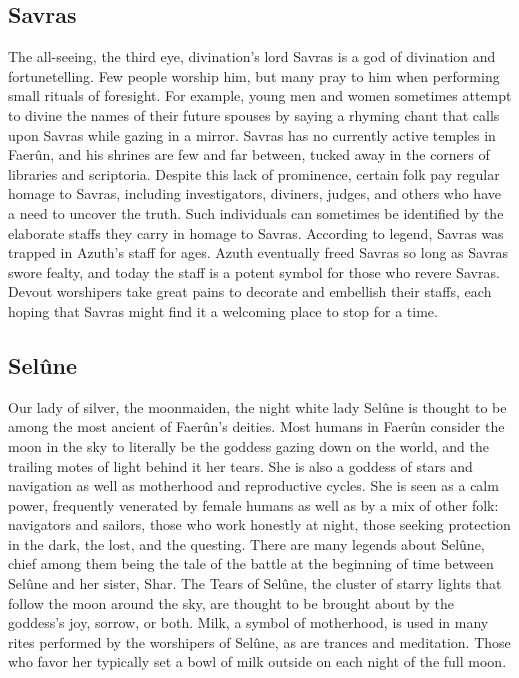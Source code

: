 \documentclass[10pt,a4paper,twoside,twocolumn,openany,bg=print,nodeprecatedcode]{dndbook}
\begin{document}
\subsection{Savras}
The all-seeing, the third eye, divination's lord
Savras is a god of divination and fortunetelling. Few people worship him, but many pray to him when performing small rituals of foresight. For example, young men and women sometimes attempt to divine the names of their future spouses by saying a rhyming chant that calls upon Savras while gazing in a mirror.
Savras has no currently active temples in Faerûn, and his shrines are few and far between, tucked away in the corners of libraries and scriptoria. Despite this lack of prominence, certain folk pay regular homage to Savras, including investigators, diviners, judges, and others who have a need to uncover the truth. Such individuals can sometimes be identified by the elaborate staffs they carry in homage to Savras. According to legend, Savras was trapped in Azuth's staff for ages. Azuth eventually freed Savras so long as Savras swore fealty, and today the staff is a potent symbol for those who revere Savras. Devout worshipers take great pains to decorate and embellish their staffs, each hoping that Savras might find it a welcoming place to stop for a time.
\subsection{Selûne}
Our lady of silver, the moonmaiden, the night white lady
Selûne is thought to be among the most ancient of Faerûn's deities. Most humans in Faerûn consider the moon in the sky to literally be the goddess gazing down on the world, and the trailing motes of light behind it her tears. She is also a goddess of stars and navigation as well as motherhood and reproductive cycles. She is seen as a calm power, frequently venerated by female humans as well as by a mix of other folk: navigators and sailors, those who work honestly at night, those seeking protection in the dark, the lost, and the questing.
There are many legends about Selûne, chief among them being the tale of the battle at the beginning of time between Selûne and her sister, Shar. The Tears of Selûne, the cluster of starry lights that follow the moon around the sky, are thought to be brought about by the goddess's joy, sorrow, or both.
Milk, a symbol of motherhood, is used in many rites performed by the worshipers of Selûne, as are trances and meditation. Those who favor her typically set a bowl of milk outside on each night of the full moon.
\end{document}
